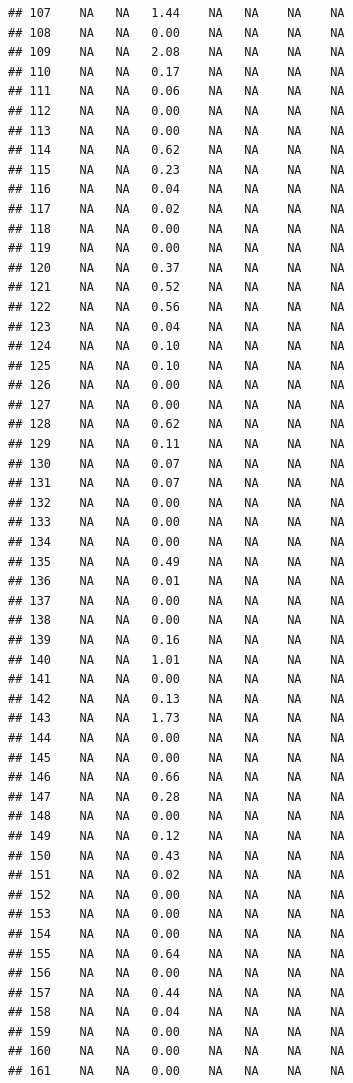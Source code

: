 \documentclass{article}\usepackage{graphicx, color}
\makeatletter
\newenvironment{kframe}{%
 \def\at@end@of@kframe{}%
 \ifinner\ifhmode%
  \def\at@end@of@kframe{\end{minipage}}%
  \begin{minipage}{\columnwidth}%
 \fi\fi%
 \def\FrameCommand##1{\hskip\@totalleftmargin \hskip-\fboxsep
 \colorbox{shadecolor}{##1}\hskip-\fboxsep
     \hskip-\linewidth \hskip-\@totalleftmargin \hskip\columnwidth}%
 \MakeFramed {\advance\hsize-\width
   \@totalleftmargin\z@ \linewidth\hsize
   \@setminipage}}%
 {\par\unskip\endMakeFramed%
 \at@end@of@kframe}
\newenvironment{knitrout}{}{} %
\makeatother
\begin{document}
\begin{knitrout}
\begin{kframe}
\begin{verbatim}
## 107    NA   NA   1.44    NA   NA    NA    NA
## 108    NA   NA   0.00    NA   NA    NA    NA
## 109    NA   NA   2.08    NA   NA    NA    NA
## 110    NA   NA   0.17    NA   NA    NA    NA
## 111    NA   NA   0.06    NA   NA    NA    NA
## 112    NA   NA   0.00    NA   NA    NA    NA
## 113    NA   NA   0.00    NA   NA    NA    NA
## 114    NA   NA   0.62    NA   NA    NA    NA
## 115    NA   NA   0.23    NA   NA    NA    NA
## 116    NA   NA   0.04    NA   NA    NA    NA
## 117    NA   NA   0.02    NA   NA    NA    NA
## 118    NA   NA   0.00    NA   NA    NA    NA
## 119    NA   NA   0.00    NA   NA    NA    NA
## 120    NA   NA   0.37    NA   NA    NA    NA
## 121    NA   NA   0.52    NA   NA    NA    NA
## 122    NA   NA   0.56    NA   NA    NA    NA
## 123    NA   NA   0.04    NA   NA    NA    NA
## 124    NA   NA   0.10    NA   NA    NA    NA
## 125    NA   NA   0.10    NA   NA    NA    NA
## 126    NA   NA   0.00    NA   NA    NA    NA
## 127    NA   NA   0.00    NA   NA    NA    NA
## 128    NA   NA   0.62    NA   NA    NA    NA
## 129    NA   NA   0.11    NA   NA    NA    NA
## 130    NA   NA   0.07    NA   NA    NA    NA
## 131    NA   NA   0.07    NA   NA    NA    NA
## 132    NA   NA   0.00    NA   NA    NA    NA
## 133    NA   NA   0.00    NA   NA    NA    NA
## 134    NA   NA   0.00    NA   NA    NA    NA
## 135    NA   NA   0.49    NA   NA    NA    NA
## 136    NA   NA   0.01    NA   NA    NA    NA
## 137    NA   NA   0.00    NA   NA    NA    NA
## 138    NA   NA   0.00    NA   NA    NA    NA
## 139    NA   NA   0.16    NA   NA    NA    NA
## 140    NA   NA   1.01    NA   NA    NA    NA
## 141    NA   NA   0.00    NA   NA    NA    NA
## 142    NA   NA   0.13    NA   NA    NA    NA
## 143    NA   NA   1.73    NA   NA    NA    NA
## 144    NA   NA   0.00    NA   NA    NA    NA
## 145    NA   NA   0.00    NA   NA    NA    NA
## 146    NA   NA   0.66    NA   NA    NA    NA
## 147    NA   NA   0.28    NA   NA    NA    NA
## 148    NA   NA   0.00    NA   NA    NA    NA
## 149    NA   NA   0.12    NA   NA    NA    NA
## 150    NA   NA   0.43    NA   NA    NA    NA
## 151    NA   NA   0.02    NA   NA    NA    NA
## 152    NA   NA   0.00    NA   NA    NA    NA
## 153    NA   NA   0.00    NA   NA    NA    NA
## 154    NA   NA   0.00    NA   NA    NA    NA
## 155    NA   NA   0.64    NA   NA    NA    NA
## 156    NA   NA   0.00    NA   NA    NA    NA
## 157    NA   NA   0.44    NA   NA    NA    NA
## 158    NA   NA   0.04    NA   NA    NA    NA
## 159    NA   NA   0.00    NA   NA    NA    NA
## 160    NA   NA   0.00    NA   NA    NA    NA
## 161    NA   NA   0.00    NA   NA    NA    NA

\end{verbatim}
\end{kframe}
\end{knitrout}
\end{document}
